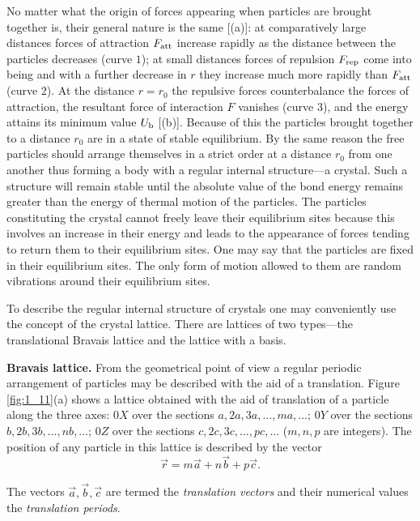 No matter what the origin of forces appearing when particles are brought together is, their general nature is the same [(a)]: at comparatively large distances forces of attraction $F_{\text{att}}$ increase rapidly as the distance between the particles decreases (curve $1$); at small distances forces of repulsion $F_{\text{rep}}$ come into being and with a further decrease in $r$ they increase much more rapidly than $F_{\text{att}}$ (curve $2$). At the distance $r=r_0$ the repulsive forces counterbalance the forces of attraction, the resultant force of interaction $F$ vanishes (curve $3$), and the energy attains its minimum value $U_{\text{b}}$ [(b)]. Because of this the particles brought together to a distance $r_0$ are in a state of stable equilibrium. By the same reason the free particles should arrange themselves in a strict
order at a distance $r_0$ from one another thus forming a body with a regular internal structure---a crystal. Such a structure will remain stable until the absolute value of the bond energy remains greater than the energy of thermal motion of the particles. The particles constituting
the crystal cannot freely leave their equilibrium sites because this involves an increase in their energy and leads to the appearance of forces tending to return them to their equilibrium sites. One may say that the particles are fixed in their equilibrium sites. The only form of motion allowed to them are random vibrations around their equilibrium sites.

To describe the regular internal structure of crystals one may conveniently use the concept of the crystal lattice. There are lattices of two types---the translational Bravais lattice and the lattice with a basis.

\textbf{Bravais lattice.} From the geometrical point of view a regular periodic arrangement of particles may be described with the aid of a translation. Figure \ref{fig:1_11}(a) shows a lattice obtained with the aid of translation of a particle along the three axes: $0X$ over the sections $a, 2a, 3a,\ldots, ma, \ldots$; $0Y$ over the sections $b, 2b, 3b, \ldots, nb, \ldots$; $0Z$ over the sections $c, 2c, 3c, \ldots, pc, \ldots$ ($m, n, p$ are integers). The position of any particle in this lattice is described by the vector
\begin{equation}\label{eq:1_16}
	\vec{r} = m\vec{a} + n\vec{b} + p\vec{c}.
\end{equation}

\noindent
The vectors $\vec{a}, \vec{b}, \vec{c}$ are termed the \textit{translation vectors} and their numerical values the \textit{translation periods}.

